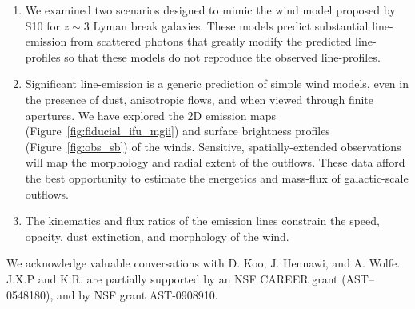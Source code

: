 \documentclass[12pt,preprint]{aastex}
\begin{document}
\begin{enumerate}
\item We examined two scenarios designed to mimic the wind model
  proposed by S10 for $z \sim 3$ Lyman break galaxies.  These models
  predict substantial line-emission from scattered photons that
  greatly modify the predicted line-profiles so that  
  these models do not reproduce the observed line-profiles.



\item Significant line-emission is a generic prediction of simple wind
  models, even in the presence of dust, anisotropic flows, and when
  viewed through finite apertures.  We have explored the 2D emission
  maps (Figure~\ref{fig:fiducial_ifu_mgii}) and surface brightness 
  profiles (Figure~\ref{fig:obs_sb}) of
  the winds.  Sensitive, spatially-extended observations will map the
  morphology and radial extent of the outflows.  These data afford the
  best opportunity to estimate the energetics and mass-flux of
  galactic-scale outflows.

\item The kinematics and flux ratios of the emission lines 
  constrain the %
  speed, opacity, dust extinction, and morphology of the
  wind.



\end{enumerate}

\acknowledgments

We acknowledge valuable conversations with D. Koo, J. Hennawi, and
A. Wolfe. 
J.X.P and K.R. are partially supported
by an NSF CAREER grant (AST--0548180), and 
by NSF grant AST-0908910.

\clearpage

%
%



\clearpage







\end{document}
